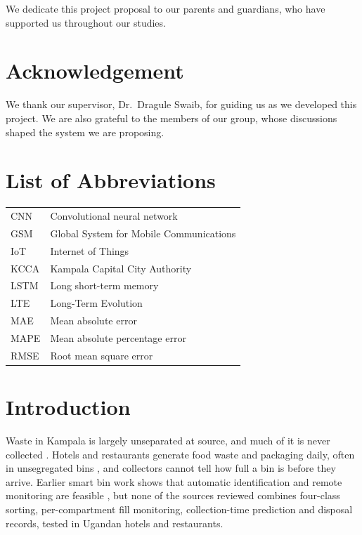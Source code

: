 \documentclass[12pt,a4paper]{report}
\newcommand{\supervisor}{Dr.\ Dragule Swaib}
\newcommand{\doctypelower}{project proposal}
\begin{document}
We dedicate this \doctypelower{} to our parents and guardians, who have supported us throughout our studies.

\chapter*{Acknowledgement}

We thank our supervisor, \supervisor, for guiding us as we developed this project. We are also grateful to the members of our group, whose discussions shaped the system we are proposing.

\tableofcontents

\clearpage
\listoffigures
{}
\listoftables
{}
\chapter*{List of Abbreviations}
\begin{tabular}{@{}p{2.6cm}p{10cm}@{}}
CNN & Convolutional neural network\\
GSM & Global System for Mobile Communications\\
IoT & Internet of Things\\
KCCA & Kampala Capital City Authority\\
LSTM & Long short-term memory\\
LTE & Long-Term Evolution\\
MAE & Mean absolute error\\
MAPE & Mean absolute percentage error\\
RMSE & Root mean square error\\
\end{tabular}
\clearpage
{}
\chapter{Introduction}

Waste in Kampala is largely unseparated at source, and much of it is never collected \cite{kcca2026,mwesigwa}. Hotels and restaurants generate food waste and packaging daily, often in unsegregated bins \cite{walina,ssepuuya}, and collectors cannot tell how full a bin is before they arrive. Earlier smart bin work shows that automatic identification and remote monitoring are feasible \cite{musoke,turyahebwa,ahmed,white}, but none of the sources reviewed combines four-class sorting, per-compartment fill monitoring, collection-time prediction and disposal records, tested in Ugandan hotels and restaurants.
\end{document}
